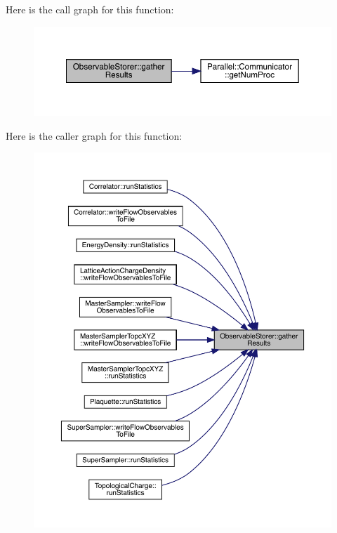 Here is the call graph for this function\+:\nopagebreak
\begin{figure}[H]
\begin{center}
\leavevmode
\includegraphics[width=350pt]{class_observable_storer_a593f13b0dd0f9d20608ef6b84fda3f1d_cgraph}
\end{center}
\end{figure}
Here is the caller graph for this function\+:\nopagebreak
\begin{figure}[H]
\begin{center}
\leavevmode
\includegraphics[width=350pt]{class_observable_storer_a593f13b0dd0f9d20608ef6b84fda3f1d_icgraph}
\end{center}
\end{figure}
\mbox{\label{class_observable_storer_af03e1c58c3e0efff251ef9b65cc8d152}} 
